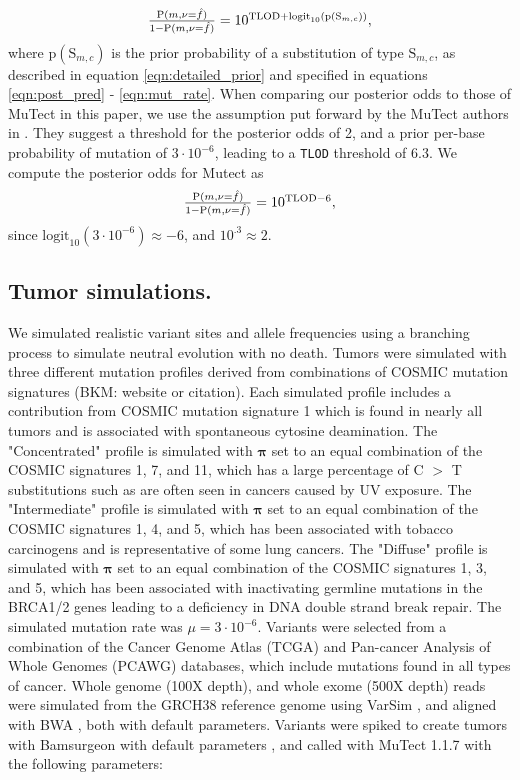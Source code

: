 \documentclass[a4,center,fleqn]{NAR}
\newcommand{\bkmcomment}[1]{{\color{blue}BKM: #1}}
\begin{document}
\begin{equation}
  \label{eqn:computed_posterior}
  $$
  \frac{\mathrm{P}(m,\nu = \hat{f})}{1 - \mathrm{P}(m,\nu = \hat{f})} = 10^{\mathrm{TLOD} + \mathrm{logit}_{10}(\mathrm{p}(\mathrm{S}_{m,c}))},
  $$
\end{equation}
where $\mathrm{p}(\mathrm{S}_{m,c})$ is the prior probability of a substitution of type $\mathrm{S}_{m,c}$, as described in equation \ref{eqn:detailed_prior} and specified in equations \ref{eqn:post_pred} - \ref{eqn:mut_rate}.
When comparing our posterior odds to those of MuTect in this paper, we use the assumption put forward by the MuTect authors in \citet{Cibulskis2013}.
They suggest a threshold for the posterior odds of 2, and a prior per-base probability of mutation of $3\cdot10^{-6}$, leading to a \texttt{TLOD} threshold of 6.3.
We compute the posterior odds for Mutect as
\begin{equation}
  \label{eqn:mutect_posterior}
  $$
  \frac{\mathrm{P}(m,\nu = \hat{f})}{1 - \mathrm{P}(m,\nu = \hat{f})} = 10^{\mathrm{TLOD} - 6},
  $$
\end{equation}
since $\mathrm{logit}_{10}(3\cdot10^{-6}) \approx -6$, and $10^{.3} \approx 2$.

\subsection{Tumor simulations.}
We simulated realistic variant sites and allele frequencies using a branching process to simulate neutral evolution with no death.
Tumors were simulated with three different mutation profiles derived from combinations of COSMIC mutation signatures (\bkmcomment{website or citation}).
Each simulated profile includes a contribution from COSMIC mutation signature 1 which is found in nearly all tumors and is associated with spontaneous cytosine deamination.
The "Concentrated" profile is simulated with $\mathbf{\pi}$ set to an equal combination of the COSMIC signatures 1, 7, and 11, which has a large percentage of C $>$ T substitutions such as are often seen in cancers caused by UV exposure.
The "Intermediate" profile is simulated with $\mathbf{\pi}$ set to an equal combination of the COSMIC signatures 1, 4, and 5, which has been associated with tobacco carcinogens and is representative of some lung cancers.
The "Diffuse" profile is simulated with $\mathbf{\pi}$ set to an equal combination of the COSMIC signatures 1, 3, and 5, which has been associated with inactivating germline mutations in the BRCA1/2 genes leading to a deficiency in DNA double strand break repair.
The simulated mutation rate was $\mu = 3\cdot10^{-6}$.
Variants were selected from a combination of the Cancer Genome Atlas (TCGA) and Pan-cancer Analysis of Whole Genomes (PCAWG) databases, which include mutations found in all types of cancer.
Whole genome (100X depth), and whole exome (500X depth) reads were simulated from the GRCH38 reference genome using VarSim \cite{Mu2015}, and aligned with BWA \cite{Li2009a}, both with default parameters.
Variants were spiked to create tumors with Bamsurgeon with default parameters \cite{Ewing2015a},
and called with MuTect 1.1.7 \cite{Cibulskis2013} with the following parameters:
\end{document}
